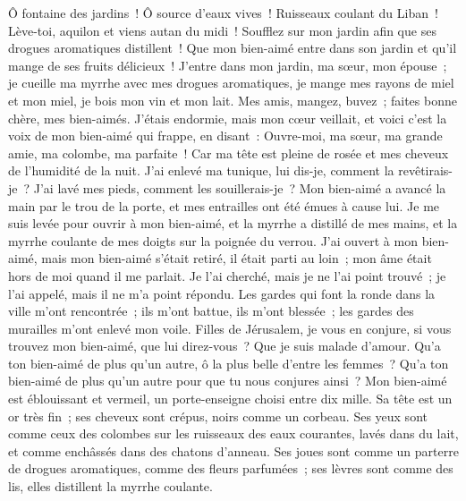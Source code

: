 \begin{multicols}{2}
Ô fontaine des jardins~! Ô source d'eaux vives~! Ruisseaux coulant du Liban~!
Lève-toi, aquilon et viens autan du midi~! Soufflez sur mon jardin afin que ses drogues aromatiques distillent~!  Que mon bien-aimé entre dans son jardin et qu'il mange de ses fruits délicieux~!
\VerseOne{} J'entre dans mon jardin, ma sœur, mon épouse~; je cueille ma myrrhe avec mes drogues aromatiques, je mange mes rayons de miel et mon miel, je bois mon vin et mon lait. Mes amis, mangez, buvez~; faites bonne chère, mes bien-aimés.
 J'étais endormie, mais mon cœur veillait, et voici c'est la voix de mon bien-aimé qui frappe, en disant~:  Ouvre-moi, ma sœur, ma grande amie, ma colombe, ma parfaite~! Car ma tête est pleine de rosée et mes cheveux de l'humidité de la nuit.
 J'ai enlevé ma tunique, lui dis-je, comment la revêtirais-je~? J'ai lavé mes pieds, comment les souillerais-je~?
Mon bien-aimé a avancé la main par le trou de la porte, et mes entrailles ont été émues à cause lui.
Je me suis levée pour ouvrir à mon bien-aimé, et la myrrhe a distillé de mes mains, et la myrrhe coulante de mes doigts sur la poignée du verrou.
J'ai ouvert à mon bien-aimé, mais mon bien-aimé s'était retiré, il était parti au loin~; mon âme était hors de moi quand il me parlait. Je l'ai cherché, mais je ne l'ai point trouvé~; je l'ai appelé, mais il ne m'a point répondu.
Les gardes qui font la ronde dans la ville m'ont rencontrée~; ils m'ont battue, ils m'ont blessée~; les gardes des murailles m'ont enlevé mon voile.
Filles de Jérusalem, je vous en conjure, si vous trouvez mon bien-aimé, que lui direz-vous~? Que je suis malade d'amour.
 Qu'a ton bien-aimé de plus qu'un autre, ô la plus belle d'entre les femmes~? Qu'a ton bien-aimé de plus qu'un autre pour que tu nous conjures ainsi~?
 Mon bien-aimé est éblouissant et vermeil, un porte-enseigne choisi entre dix mille.
Sa tête est un or très fin~; ses cheveux sont crépus, noirs comme un corbeau.
Ses yeux sont comme ceux des colombes sur les ruisseaux des eaux courantes, lavés dans du lait, et comme enchâssés dans des chatons d'anneau. 
Ses joues sont comme un parterre de drogues aromatiques, comme des fleurs parfumées~; ses lèvres sont comme des lis, elles distillent la myrrhe coulante. 

\end{multicols}
